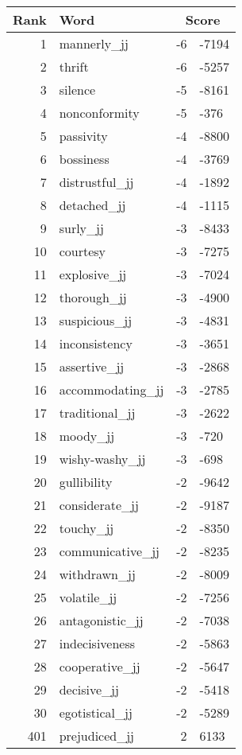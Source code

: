 \begin{longtable}[!htbp]{| rlr@{.}l |}
    \hline
    \textbf{Rank} & \textbf{Word} & \multicolumn{2}{c|}{\textbf{Score}} \\
    \hline
    \endhead
    1 & mannerly\_jj & -6 & -7194 \\
    2 & thrift & -6 & -5257 \\
    3 & silence & -5 & -8161 \\
    4 & nonconformity & -5 & -376 \\
    5 & passivity & -4 & -8800 \\
    6 & bossiness & -4 & -3769 \\
    7 & distrustful\_jj & -4 & -1892 \\
    8 & detached\_jj & -4 & -1115 \\
    9 & surly\_jj & -3 & -8433 \\
    10 & courtesy & -3 & -7275 \\
    11 & explosive\_jj & -3 & -7024 \\
    12 & thorough\_jj & -3 & -4900 \\
    13 & suspicious\_jj & -3 & -4831 \\
    14 & inconsistency & -3 & -3651 \\
    15 & assertive\_jj & -3 & -2868 \\
    16 & accommodating\_jj & -3 & -2785 \\
    17 & traditional\_jj & -3 & -2622 \\
    18 & moody\_jj & -3 & -720 \\
    19 & wishy-washy\_jj & -3 & -698 \\
    20 & gullibility & -2 & -9642 \\
    21 & considerate\_jj & -2 & -9187 \\
    22 & touchy\_jj & -2 & -8350 \\
    23 & communicative\_jj & -2 & -8235 \\
    24 & withdrawn\_jj & -2 & -8009 \\
    25 & volatile\_jj & -2 & -7256 \\
    26 & antagonistic\_jj & -2 & -7038 \\
    27 & indecisiveness & -2 & -5863 \\
    28 & cooperative\_jj & -2 & -5647 \\
    29 & decisive\_jj & -2 & -5418 \\
    30 & egotistical\_jj & -2 & -5289 \\
    401 & prejudiced\_jj & 2 & 6133 \\

\end{longtable}
